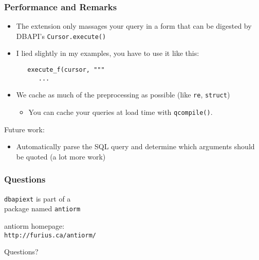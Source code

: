 \documentclass{beamer}
\begin{document}
\begin{frame}[fragile]
  \frametitle{Performance and Remarks}

  \begin{itemize}
  \item The extension only massages your query in a form that can be digested by
    DBAPI's \texttt{Cursor.execute()}

\pause
  \item I lied slightly in my examples, you have to use it like this:
\begin{verbatim}
   execute_f(cursor, """
      ...
\end{verbatim}

\pause
  \item We cache as much of the preprocessing as possible (like \texttt{re},
    \texttt{struct})
    \begin{itemize}
    \item You can cache your queries at load time with \texttt{qcompile()}.
    \end{itemize}
  \end{itemize}

\vfill
\pause
Future work:
\begin{itemize}
\item Automatically parse the SQL query and determine which arguments should be
  quoted (a lot more work)
\end{itemize}

\end{frame}



\begin{frame}[fragile]
  \frametitle{Questions}

  \begin{center}


{\Large
\texttt{dbapiext} is part of a \\
package named \texttt{antiorm}
}

\vfill

{\LARGE
antiorm homepage: \\
\verb=http://furius.ca/antiorm/=
}

\vfill

{\LARGE Questions?}

  \end{center}

\end{frame}


\end{document}
